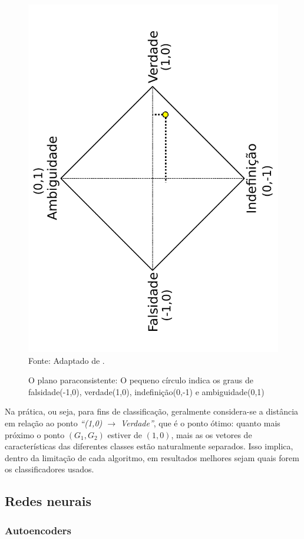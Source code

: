 			\begin{figure}[H]
				\centering
				\caption{O plano paraconsistente: O pequeno círculo indica os graus de falsidade(-1,0), verdade(1,0), indefinição(0,-1) e ambiguidade(0,1)}
				\includegraphics[angle=-90, width=0.69\linewidth]{images/paraconsistentPlane.pdf}
				\label{fig:paraconsistentplane}
				\\Fonte: Adaptado de \cite{8588433}.
			\end{figure}
			\par Na prática, ou seja, para fins de classificação, geralmente considera-se a distância em relação ao ponto \textit{``(1,0) $\rightarrow$ Verdade''}, que é o ponto ótimo: quanto mais próximo o ponto $(G_1,G_2)$ estiver de $(1,0)$, mais as os vetores de características das diferentes classes estão naturalmente separados. Isso implica, dentro da limitação de cada algoritmo, em resultados melhores sejam quais forem os classificadores usados.
	
	\subsection{Redes neurais}
		\subsubsection{Autoencoders}
		
